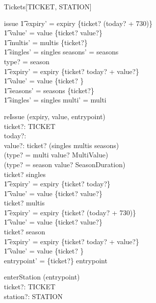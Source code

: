 \documentclass[11pt]{article}
\begin{document}
\begin{class}{Tickets[TICKET, STATION]}
\begin{op}{issue}
\t1 expiry' = expiry \cup \{ticket? \mapsto (today? + 730)\} \land \\ 
\t1 value' = value \cup \{ticket? \mapsto value?\} \land \\ 
\t1 multis' = multis \cup \{ticket?\} \land \\ 
\t1 singles' = singles \land seasons' = seasons\\
type? = season \implies\\
\t1 expiry' = expiry \cup \{ticket? \mapsto today? + value?\} \land \\ 
\t1 value' = value \cup \{ticket? \} \land \\ 
\t1 seasons' = seasons \cup \{ticket?\} \land \\ 
\t1 singles' = singles \land  multi' = multi
\end{op}
\classbreak 
\begin{op}{reIssue}
\Delta (expiry, value, entrypoint)\\
ticket?: TICKET \\ 
today?:  \nat  \\ 
value?:  \nat  
\where
 ticket? \in (singles \cup multis \cup seasons) \land\\
     (type? = multi \implies value? \in MultiValue) \land\\
     (type? = season \implies value? \in SeasonDuration)\\
ticket? \in singles \implies\\
\t1 expiry' = expiry \oplus \{ticket? \mapsto today?\} \land \\ 
\t1 value' = value \oplus \{ticket? \mapsto value?\}\\ 
ticket? \in multis \implies\\
\t1 expiry' = expiry \oplus  \{ticket? \mapsto (today? + 730)\} \land \\ 
\t1 value' = value \oplus \{ticket? \mapsto value?\} \\ 
ticket? \in season \implies\\
\t1 expiry' = expiry \oplus \{ticket? \mapsto today? + value?\} \land \\ 
\t1 value' = value \oplus \{ticket? \}\\
entrypoint' = \{ticket?\} \ndres entrypoint
\end{op} \classbreak 
\begin{op}{enterStation}
\Delta (entrypoint)\\
ticket?: TICKET \\ 
station?: STATION \\ 

\end{op}
\end{class}
\end{document}
